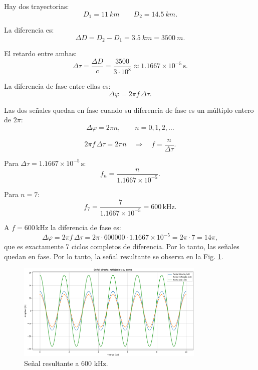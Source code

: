 Hay dos trayectorias:
    \[
         D_1 = \SI{11}{km} \qquad D_2 = \SI{14.5}{km}.  
    \]
\bigskip

La diferencia es:
    \[
        \Delta D = D_2 - D_1 = \SI{3.5}{km} = \SI{3500}{m}.
    \]
\bigskip

El retardo entre ambas:
    \[
        \Delta \tau = \frac{\Delta D}{c} = 
        \frac{3500}{3 \cdot 10^{8}}
        \approx 1.1667 \times 10^{-5}\,\text{s}.
    \]

\bigskip

La diferencia de fase entre ellas es:
    \[
        \Delta\varphi = 2\pi f \,\Delta\tau.
    \]


Las dos señales quedan en fase cuando su diferencia de fase es un múltiplo entero de \(2\pi\):
    \[
        \Delta\varphi = 2\pi n,\qquad n=0,1,2,\dots
    \]


    \[
        2\pi f \,\Delta\tau = 2\pi n \quad\Longrightarrow\quad f=\frac{n}{\Delta\tau}.
    \]
\bigskip

Para \(\Delta\tau=1.1667\times10^{-5}\,\text{s}\):
    \[
        f_n=\frac{n}{1.1667\times10^{-5}}.
    \]
\bigskip

Para \(n=7\):
    \[
        f_7=\frac{7}{1.1667\times10^{-5}}=600\,\text{kHz}.
    \]
\bigskip

A \(f=600\,\text{kHz}\) la diferencia de fase es:
    \[
        \Delta\varphi=2\pi f \,\Delta\tau=2\pi\cdot 600000\cdot1.1667\times10^{-5}
        =2\pi\cdot 7=14\pi,
    \]
que es exactamente 7 ciclos completos de diferencia. Por lo tanto, las señales quedan en fase. Por lo tanto, la señal resultante se 
observa en la Fig. \ref{fig:600kHz}.

    \begin{figure}[H]
        \centering
        \includegraphics[width=0.8\textwidth]{imagenes/Actividad_1/grafico_600kHz.png}
        \caption{Señal resultante a 600 kHz.}
        \label{fig:600kHz}
    \end{figure}
